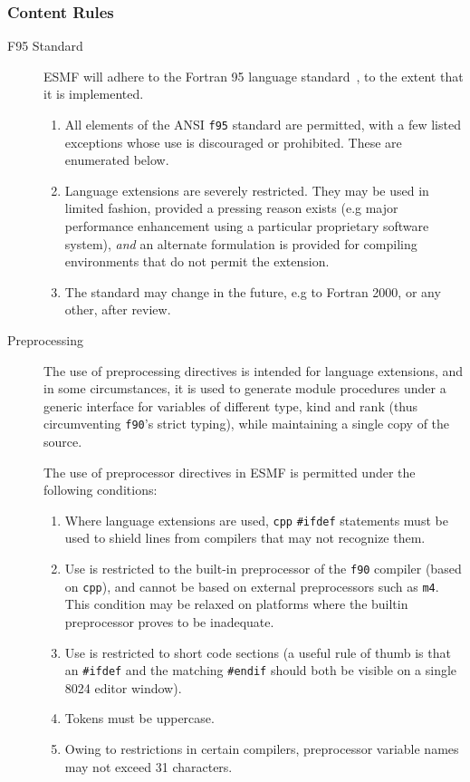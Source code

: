 \subsubsection{Content Rules}

\begin{description}

\item[F95 Standard] ESMF will adhere to the Fortran 95 language
  standard~\cite{ref:f95}, to the extent that it is implemented.

\begin{enumerate}
\item All elements of the ANSI \texttt{f95} standard are permitted,
  with a few listed exceptions whose use is discouraged or prohibited.
  These are enumerated below.
\item Language extensions are severely restricted. They may be used in
  limited fashion, provided a pressing reason exists (e.g major
  performance enhancement using a particular proprietary software
  system), \emph{and} an alternate formulation is provided for compiling
  environments that do not permit the extension.
\item The standard may change in the future, e.g to Fortran 2000, or
  any other, after review.
\end{enumerate}
  
\item[Preprocessing] The use of preprocessing directives is intended
  for language extensions, and in some circumstances, it is used to
  generate module procedures under a generic interface for variables
  of different type, kind and rank (thus circumventing \texttt{f90}'s
  strict typing), while maintaining a single copy of the source.

The use of preprocessor directives in ESMF is permitted under the
following conditions:

\begin{enumerate}
\item Where language extensions are used, \texttt{cpp}
  \texttt{\#ifdef} statements must be used to shield lines from
  compilers that may not recognize them.
\item Use is restricted to the built-in preprocessor of the
  \texttt{f90} compiler (based on \texttt{cpp}), and cannot be based
  on external preprocessors such as \texttt{m4}. This condition may be
  relaxed on platforms where the builtin preprocessor proves to be
  inadequate.
\item Use is restricted to short code sections (a useful rule of thumb
  is that an \texttt{\#ifdef} and the matching \texttt{\#endif} should
  both be visible on a single 8024 editor
  window).
\item Tokens must be uppercase.
\item Owing to restrictions in certain compilers, preprocessor
  variable names may not exceed 31 characters.
\end{enumerate}


\end{description}
